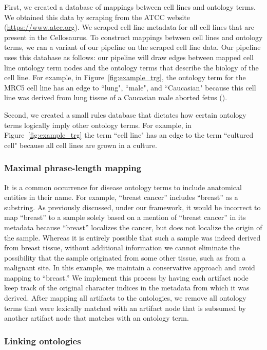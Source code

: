 First, we created a database of mappings between cell lines and ontology terms.  We obtained this data by scraping from the ATCC website (\href{https://www.atcc.org}{https://www.atcc.org}). We scraped cell line metadata for all cell lines that are present in the Cellosaurus.  To construct mappings between cell lines and ontology terms, we ran a variant of our pipeline on the scraped cell line data. Our pipeline uses this database as follows: our pipeline will draw edges between mapped cell line ontology term nodes and the ontology terms that describe the biology of the cell line.   For example, in Figure~\ref{fig:example_trg}, the ontology term for the MRC5 cell line has an edge to ``lung", ``male", and ``Caucasian" because this cell line was derived from lung tissue of a Caucasian male aborted fetus (\citealp{Jacobs}).

Second, we created a small rules database that dictates how certain ontology terms logically imply other ontology terms.  For example, in Figure~\ref{fig:example_trg} the term ``cell line" has an edge to the term ``cultured cell" because all cell lines are grown in a culture.  

\subsubsection{Maximal phrase-length mapping}

It is a common occurrence for disease ontology terms to include anatomical entities in their name. For example, ``breast cancer'' includes ``breast'' as a substring. As previously discussed, under our framework, it would be incorrect to map ``breast'' to a sample solely based on a mention of ``breast cancer'' in its metadata because ``breast'' localizes the cancer, but does not localize the origin of the sample.  Whereas it is entirely possible that such a sample was indeed derived from breast tissue, without additional information we cannot eliminate the possibility that the sample originated from some other tissue, such as from a malignant site.  In this example, we maintain a conservative approach and avoid mapping to ``breast.''  We implement this process by having each artifact node keep track of the original character indices in the metadata from which it was derived. After mapping all artifacts to the ontologies, we remove all ontology terms that were lexically matched with an artifact node that is subsumed by another artifact node that matches with an ontology term.  

\subsubsection{Linking ontologies}


